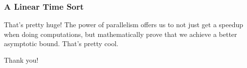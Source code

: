 \documentclass[aspectratio=169]{beamer}
\begin{document}
\begin{frame}[fragile]
  \frametitle{A Linear Time Sort}

  That's pretty huge! The power of parallelism offers us to not just get a 
  speedup when doing computations, but mathematically prove that we achieve
  a better asymptotic bound. That's pretty cool.
\end{frame}

\begin{frame}[fragile]
	\begin{center} Thank you! \end{center}
\end{frame}
\end{document}
